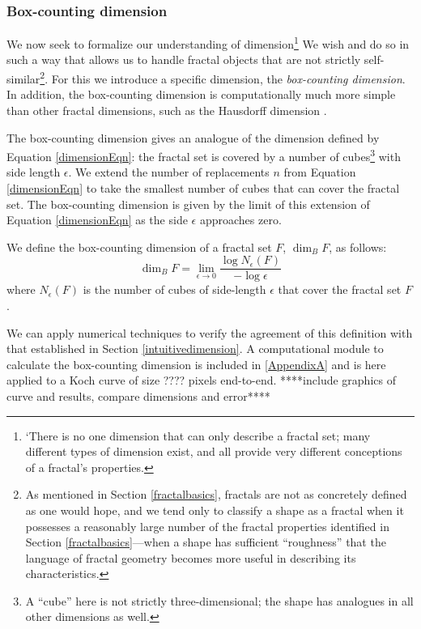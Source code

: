 \subsubsection{Box-counting dimension}
We now seek to formalize our understanding of dimension\footnote{`There is no one dimension that can only describe a fractal set; many different types of dimension exist, and all provide very different conceptions of a fractal's properties\citep{fractaltextbook}.} We wish  and do so in such a way that allows us to handle fractal objects that are not strictly self-similar\footnote{As mentioned in Section \ref{fractalbasics}, fractals are not as concretely defined as one would hope, and we tend only to classify a shape as a fractal when it possesses a reasonably large number of the fractal properties identified in Section \ref{fractalbasics}---when a shape has sufficient ``roughness'' that the language of fractal geometry becomes more useful in describing its characteristics.}. For this we introduce a specific dimension, the \textit{box-counting dimension}. In addition, the box-counting dimension is computationally much more simple than other fractal dimensions, such as the Hausdorff dimension \citep{fractaltextbook}.

The box-counting dimension gives an analogue of the dimension defined by Equation \ref{dimensionEqn}: the fractal set is covered by a number of cubes\footnote{A ``cube'' here is not strictly three-dimensional; the shape has analogues in all other dimensions as well.} with side length $\epsilon$. We extend the number of replacements $ n $ from Equation \ref{dimensionEqn} to take the smallest number of cubes that can cover the fractal set. The box-counting dimension is given by the limit of this extension of Equation \ref{dimensionEqn} as the side $\epsilon$ approaches zero.

\begin{mydef} We define the box-counting dimension of a fractal set $ F $, $\operatorname{dim}_B F $, as follows:
\begin{equation}\operatorname{dim}_B F = \lim_{\epsilon \to 0} \frac{\log N_\epsilon(F)}{-\log\epsilon}
\end{equation}
where $N_\epsilon(F)$ is the number of cubes of side-length $\epsilon$ that cover the fractal set $F$.
\end{mydef}

\begin{myexample}We can apply numerical techniques to verify the agreement of this definition with that established in Section \ref{intuitivedimension}. A computational module to calculate the box-counting dimension is included in \ref{AppendixA} and is here applied to a Koch curve of size ???? pixels end-to-end. ****include graphics of curve and results, compare dimensions and error****  \end{myexample}

